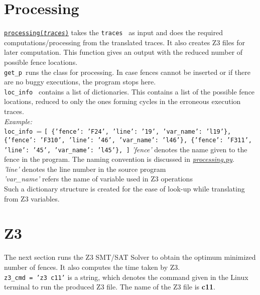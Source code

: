 \documentclass{article}
\newcommand{\var}[1]{\color{OliveGreen} \texttt{#1}\color{black}}
\newcommand{\fun}[2]{\color{Sepia}\texttt{#1(\color{Gray}\textit{#2}\color{Sepia})}\color{black}}
\newcommand{\varinfo}[1]{\scriptsize \texttt{#1} \normalsize}
\begin{document}
\section{Processing}
\par
\href{processing.tex}{\fun{processing}{traces}} takes the \var{traces } as input and does the required computations/processing from the translated traces. It also creates Z3 files for later computation. This function gives an output with the reduced number of possible fence locations.\\

\var{get\_p }runs the class for processing. In case fences cannot be inserted or if there are no buggy executions, the program stops here.\\

\var{loc\_info } contains a list of dictionaries. This contains a list of the possible fence locations, reduced to only the ones forming cycles in the erroneous execution traces.
\\
\textit{Example:}\\
\var{loc\_info }= \varinfo{[\newline
\{'fence': 'F24', 'line': '19', 'var\_name': 'l19'\}, \newline
\{'fence': 'F310', 'line': '46', 'var\_name': 'l46'\}, \newline
\{'fence': 'F311', 'line': '45', 'var\_name': 'l45'\},\newline
]} \newline
\textit{'fence'} denotes the name given to the fence in the program. The naming convention is discussed in \href{processing.tex}{\textit{processing.py}}.
\\
\textit{'line'} denotes the line number in the source program
\\
\textit{'var\_name'} refers the name of variable used in Z3 operations
\\
Such a dictionary structure is created for the ease of look-up while translating from Z3 variables.

\section{Z3}
\par
The next section runs the Z3 SMT/SAT Solver to obtain the optimum minimized number of fences. It also computes the time taken by Z3.\\

\var{z3\_cmd }\varinfo{= 'z3 c11'} is a string, which denotes the command given in the Linux terminal to run the produced Z3 file. The name of the Z3 file is \textbf{c11}.\\
\end{document}
